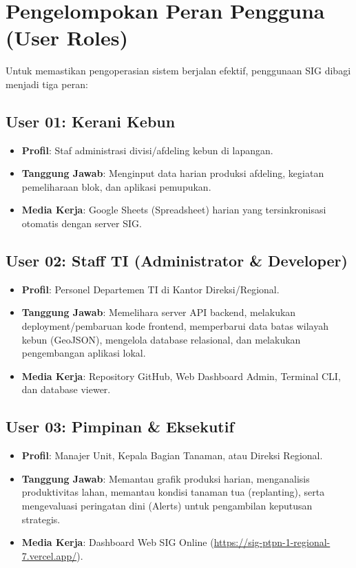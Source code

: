 \documentclass[12pt, a4paper]{article}
\begin{document}
\newpage

\section{Pengelompokan Peran Pengguna (User Roles)}
Untuk memastikan pengoperasian sistem berjalan efektif, penggunaan SIG dibagi menjadi tiga peran:

\subsection{User 01: Kerani Kebun}
\begin{itemize}
    \item \textbf{Profil}: Staf administrasi divisi/afdeling kebun di lapangan.
    \item \textbf{Tanggung Jawab}: Menginput data harian produksi afdeling, kegiatan pemeliharaan blok, dan aplikasi pemupukan.
    \item \textbf{Media Kerja}: Google Sheets (Spreadsheet) harian yang tersinkronisasi otomatis dengan server SIG.
\end{itemize}

\subsection{User 02: Staff TI (Administrator & Developer)}
\begin{itemize}
    \item \textbf{Profil}: Personel Departemen TI di Kantor Direksi/Regional.
    \item \textbf{Tanggung Jawab}: Memelihara server API backend, melakukan deployment/pembaruan kode frontend, memperbarui data batas wilayah kebun (GeoJSON), mengelola database relasional, dan melakukan pengembangan aplikasi lokal.
    \item \textbf{Media Kerja}: Repository GitHub, Web Dashboard Admin, Terminal CLI, dan database viewer.
\end{itemize}

\subsection{User 03: Pimpinan \& Eksekutif}
\begin{itemize}
    \item \textbf{Profil}: Manajer Unit, Kepala Bagian Tanaman, atau Direksi Regional.
    \item \textbf{Tanggung Jawab}: Memantau grafik produksi harian, menganalisis produktivitas lahan, memantau kondisi tanaman tua (replanting), serta mengevaluasi peringatan dini (Alerts) untuk pengambilan keputusan strategis.
    \item \textbf{Media Kerja}: Dashboard Web SIG Online (\href{https://sig-ptpn-1-regional-7.vercel.app/}{https://sig-ptpn-1-regional-7.vercel.app/}).
\end{itemize}
\end{document}
